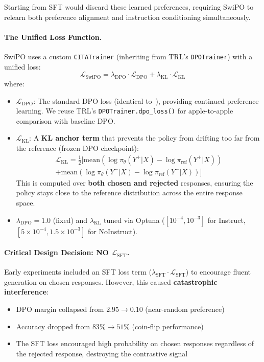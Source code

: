 Starting from SFT would discard these learned preferences, requiring SwiPO to relearn both preference alignment and instruction conditioning simultaneously.

\paragraph{The Unified Loss Function.} SwiPO uses a custom \texttt{CITATrainer} (inheriting from TRL's \texttt{DPOTrainer}) with a unified loss:
\begin{equation*}
    \mathcal{L}_{\mathrm{SwiPO}} = \lambda_{\text{DPO}} \cdot \mathcal{L}_{\text{DPO}} + \lambda_{\text{KL}} \cdot \mathcal{L}_{\text{KL}}
\end{equation*}
where:
\begin{itemize}[leftmargin=*]
    \item $\mathcal{L}_{\text{DPO}}$: The standard DPO loss (identical to~\cite{rafailov2023direct}), providing continued preference learning. We reuse TRL's \texttt{DPOTrainer.dpo\_loss()} for apple-to-apple comparison with baseline DPO.

    \item $\mathcal{L}_{\text{KL}}$: A \textbf{KL anchor term} that prevents the policy from drifting too far from the reference (frozen DPO checkpoint):
    {\small
    \begin{multline*}
        \mathcal{L}_{\text{KL}} = \frac{1}{2} \Big[ \text{mean}\!\left(\log \pi_\theta(Y^+ | X) - \log \pi_{\text{ref}}(Y^+ | X)\right) \\
        + \text{mean}\!\left(\log \pi_\theta(Y^- | X) - \log \pi_{\text{ref}}(Y^- | X)\right) \Big]
    \end{multline*}
    }
    This is computed over \textbf{both chosen and rejected} responses, ensuring the policy stays close to the reference distribution across the entire response space.

    \item $\lambda_{\text{DPO}} = 1.0$ (fixed) and $\lambda_{\text{KL}}$ tuned via Optuna ($[10^{-4}, 10^{-3}]$ for Instruct, $[5\times10^{-4}, 1.5\times10^{-3}]$ for NoInstruct).
\end{itemize}

\paragraph{Critical Design Decision: NO $\mathcal{L}_{\text{SFT}}$.} Early experiments included an SFT loss term ($\lambda_{\text{SFT}} \cdot \mathcal{L}_{\text{SFT}}$) to encourage fluent generation on chosen responses. However, this caused \textbf{catastrophic interference}:
\begin{itemize}[leftmargin=*]
    \item DPO margin collapsed from $2.95 \rightarrow 0.10$ (near-random preference)
    \item Accuracy dropped from $83\% \rightarrow 51\%$ (coin-flip performance)
    \item The SFT loss encouraged high probability on chosen responses regardless of the rejected response, destroying the contrastive signal
\end{itemize}


